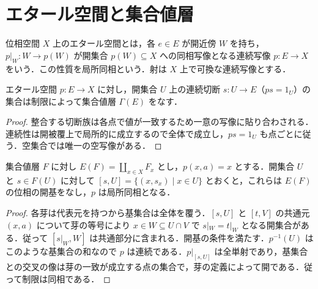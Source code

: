 \section{エタール空間と集合値層}
\begin{defn}[エタール空間]
位相空間 $X$ 上のエタール空間とは，各 $e\in E$ が開近傍 $W$ を持ち，$p|_W:W\to p(W)$ が開集合 $p(W)\subseteq X$ への同相写像となる連続写像 $p:E\to X$ をいう．この性質を局所同相という．射は $X$ 上で可換な連続写像とする．
\end{defn}
\begin{prop}[エタール空間の切断の層]
エタール空間 $p:E\to X$ に対し，開集合 $U$ 上の連続切断 $s:U\to E$（$ps=1_U$）の集合は制限によって集合値層 $\Gamma(E)$ をなす．
\end{prop}
\begin{proof}
整合する切断族は各点で値が一致するため一意の写像に貼り合わされる．連続性は開被覆上で局所的に成立するので全体で成立し，$ps=1_U$ も点ごとに従う．空集合では唯一の空写像がある．
\end{proof}
\begin{prop}[芽の空間の位相]
集合値層 $F$ に対し $E(F)=\coprod_{x\in X}F_x$ とし，$p(x,a)=x$ とする．開集合 $U$ と $s\in F(U)$ に対して $[s,U]=\{(x,s_x)\mid x\in U\}$ とおくと，これらは $E(F)$ の位相の開基をなし，$p$ は局所同相となる．
\end{prop}
\begin{proof}
各芽は代表元を持つから基集合は全体を覆う．$[s,U]$ と $[t,V]$ の共通元 $(x,a)$ について芽の等号により $x\in W\subseteq U\cap V$ で $s|_W=t|_W$ となる開集合がある．従って $[s|_W,W]$ は共通部分に含まれる．開基の条件を満たす．$p^{-1}(U)$ はこのような基集合の和なので $p$ は連続である．$p|_{[s,U]}$ は全単射であり，基集合との交叉の像は芽の一致が成立する点の集合で，芽の定義によって開である．従って制限は同相である．
\end{proof}
